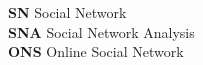 
\textbf{SN} \itab Social Network\\
\textbf{SNA} \itab Social Network Analysis\\
\textbf{ONS} \itab Online Social Network\\